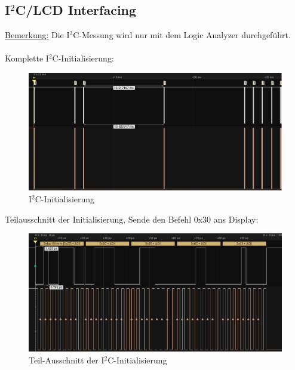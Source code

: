 \documentclass[12pt,a4paper]{article}
\begin{document}
\subsection{I$^2$C/LCD Interfacing}
\uline{Bemerkung:} Die I$^2$C-Messung wird nur mit dem Logic Analyzer durchgeführt. \\\\
Komplette I$^2$C-Initialisierung:
\begin{figure}[H]
	\centering
	\includegraphics[width=1\linewidth]{lcd_i2c_init}
	\caption{I$^2$C-Initialisierung}
	\label{figure:lcd_i2c_init}
\end{figure}

Teilausschnitt der Initialisierung, Sende den Befehl 0x30 ans Display:
\begin{figure}[H]
	\centering
	\includegraphics[width=1\linewidth]{lcd_i2c_send_cmd_0x30}
	\caption{Teil-Ausschnitt der I$^2$C-Initialisierung}
	\label{figure:lcd_i2c_send_cmd_0x30}
\end{figure}
\pagebreak
\end{document}

